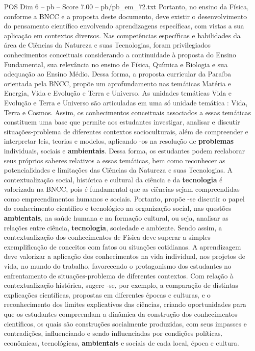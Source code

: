 \begin{textsample}{POS Dim 6 – pb – Score 7.00 – pb/pb\_em\_72.txt}
Portanto, no ensino da Física, conforme a BNCC e a proposta deste documento, deve existir o desenvolvimento do pensamento científico envolvendo aprendizagens específicas, com vistas a sua aplicação em contextos diversos.
Nas competências específicas e habilidades da área de Ciências da Natureza e suas Tecnologias, foram privilegiados conhecimentos conceituais considerando a continuidade à proposta do Ensino Fundamental, sua relevância no ensino de Física, Química e Biologia e sua adequação ao Ensino Médio.
Dessa forma, a proposta curricular da Paraíba orientada pela BNCC, propõe um aprofundamento nas temáticas Matéria e Energia, Vida e Evolução e Terra e Universo.
As unidades temáticas Vida e Evolução e Terra e Universo são articuladas em uma só unidade temática : Vida, Terra e Cosmos.
Assim, os conhecimentos conceituais associados a essas temáticas constituem uma base que permite aos estudantes investigar, analisar e discutir situações-problema de diferentes contextos socioculturais, além de compreender e interpretar leis, teorias e modelos, aplicando -os na resolução de \textbf{problemas} individuais, sociais e \textbf{ambientais}.
Dessa forma, os estudantes podem reelaborar seus próprios saberes relativos a essas temáticas, bem como reconhecer as potencialidades e limitações das Ciências da Natureza e suas Tecnologias.
A contextualização social, histórica e cultural da ciência e da \textbf{tecnologia} é valorizada na BNCC, pois é fundamental que as ciências sejam compreendidas como empreendimentos humanos e sociais.
Portanto, propõe -se discutir o papel do conhecimento científico e tecnológico na organização social, nas questões \textbf{ambientais}, na saúde humana e na formação cultural, ou seja, analisar as relações entre ciência, \textbf{tecnologia}, sociedade e ambiente.
Sendo assim, a contextualização dos conhecimentos de Física deve superar a simples exemplificação de conceitos com fatos ou situações cotidianas.
A aprendizagem deve valorizar a aplicação dos conhecimentos na vida individual, nos projetos de vida, no mundo do trabalho, favorecendo o protagonismo dos estudantes no enfrentamento de situações-problema de diferentes contextos.
Com relação à contextualização histórica, sugere -se, por exemplo, a comparação de distintas explicações científicas, propostas em diferentes épocas e culturas, e o reconhecimento dos limites explicativos das ciências, criando oportunidades para que os estudantes compreendam a dinâmica da construção dos conhecimentos científicos, os quais são construções socialmente produzidas, com seus impasses e contradições, influenciando e sendo influenciadas por condições políticas, econômicas, tecnológicas, \textbf{ambientais} e sociais de cada local, época e cultura.

\end{textsample}
